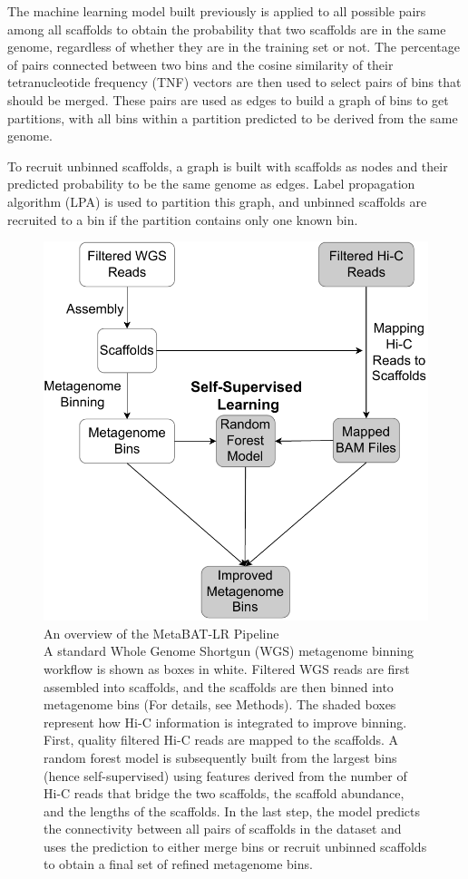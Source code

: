 \documentclass[fleqn,10pt,lineno]{wlpeerj}
\begin{document}
The machine learning model built previously is applied to all possible pairs among all scaffolds to obtain the probability that two scaffolds are in the same genome, regardless of whether they are in the training set or not. The percentage of pairs connected between two bins and the cosine similarity of their tetranucleotide frequency (TNF) vectors are then used to select pairs of bins that should be merged. These pairs are used as edges to build a graph of bins to get partitions, with all bins within a partition predicted to be derived from the same genome.  

To recruit unbinned scaffolds, a graph is built with scaffolds as nodes and their predicted probability to be the same genome as edges. Label propagation algorithm (LPA) is used to partition this graph, and unbinned scaffolds are recruited to a bin if the partition contains only one known bin. 

\begin{figure}[ht!]
\centering
\includegraphics[scale=0.55]{Strategy_Diagram11.drawio.pdf}
\caption{An overview of the MetaBAT-LR Pipeline
    \\A standard Whole Genome Shortgun (WGS) metagenome binning workflow is shown as boxes in white. Filtered WGS reads are first assembled into scaffolds, and the scaffolds are then binned into metagenome bins (For details, see Methods). The shaded boxes represent how Hi-C information is integrated to improve binning. First, quality filtered Hi-C reads are mapped to the scaffolds. A random forest model is subsequently built from the largest bins (hence self-supervised) using features derived from the number of Hi-C reads that bridge the two scaffolds, the scaffold abundance, and the lengths of the scaffolds. In the last step, the model predicts the connectivity between all pairs of scaffolds in the dataset and uses the prediction to either merge bins or recruit unbinned scaffolds to obtain a final set of refined metagenome bins.}
\label{fig:pipeline}
\end{figure}
\end{document}
